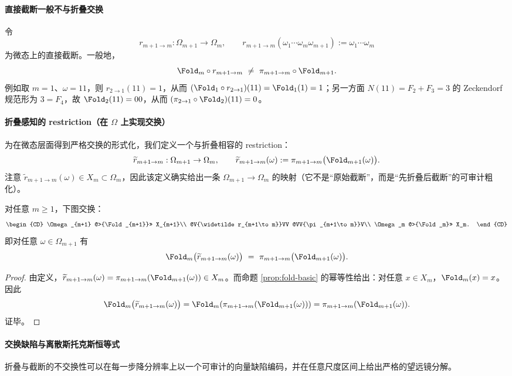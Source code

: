 \paragraph{直接截断一般不与折叠交换}
令
\[
r_{m+1\to m}:\Omega_{m+1}\to\Omega_m,\qquad
r_{m+1\to m}(\omega_1\cdots\omega_m\omega_{m+1}):=\omega_1\cdots\omega_m
\]
为微态上的直接截断。一般地，
\[
\Fold_m\circ r_{m+1\to m}\ \neq\ \pi_{m+1\to m}\circ \Fold_{m+1}.
\]
例如取 $m=1$、$\omega=11$，则 $r_{2\to 1}(11)=1$，从而 $(\Fold_1\circ r_{2\to 1})(11)=\Fold_1(1)=1$；另一方面 $N(11)=F_2+F_3=3$ 的 Zeckendorf 规范形为 $3=F_4$，故 $\Fold_2(11)=00$，从而 $(\pi_{2\to 1}\circ \Fold_2)(11)=0$。

\paragraph{折叠感知的 restriction（在 $\Omega$ 上实现交换）}
为在微态层面得到严格交换的形式化，我们定义一个与折叠相容的 restriction：
\[
\widetilde r_{m+1\to m}:\Omega_{m+1}\to \Omega_m,\qquad
\widetilde r_{m+1\to m}(\omega):=\pi_{m+1\to m}\bigl(\Fold_{m+1}(\omega)\bigr).
\]
注意 $\widetilde r_{m+1\to m}(\omega)\in X_m\subset\Omega_m$，因此该定义确实给出一条 $\Omega_{m+1}\to\Omega_m$ 的映射（它不是“原始截断”，而是“先折叠后截断”的可审计粗化）。

\begin{proposition}[跨分辨率相容的交换图]\label{prop:fold-omega-commute}
对任意 $m\ge 1$，下图交换：
\[
\begin{CD}
\Omega_{m+1} @>{\Fold_{m+1}}>> X_{m+1}\\
@V{\widetilde r_{m+1\to m}}VV @VV{\pi_{m+1\to m}}V\\
\Omega_m @>{\Fold_m}>> X_m.
\end{CD}
\]
即对任意 $\omega\in\Omega_{m+1}$ 有
\[
\Fold_m\bigl(\widetilde r_{m+1\to m}(\omega)\bigr)
\ =\
\pi_{m+1\to m}\bigl(\Fold_{m+1}(\omega)\bigr).
\]
\end{proposition}

\begin{proof}
由定义，$\widetilde r_{m+1\to m}(\omega)=\pi_{m+1\to m}(\Fold_{m+1}(\omega))\in X_m$。而命题 \ref{prop:fold-basic} 的幂等性给出：对任意 $x\in X_m$，$\Fold_m(x)=x$。因此
\[
\Fold_m\bigl(\widetilde r_{m+1\to m}(\omega)\bigr)
=\Fold_m\!\left(\pi_{m+1\to m}(\Fold_{m+1}(\omega))\right)
=\pi_{m+1\to m}(\Fold_{m+1}(\omega)).
\]
证毕。
\end{proof}

\paragraph{交换缺陷与离散斯托克斯恒等式}
折叠与截断的不交换性可以在每一步降分辨率上以一个可审计的向量缺陷编码，并在任意尺度区间上给出严格的望远镜分解。


